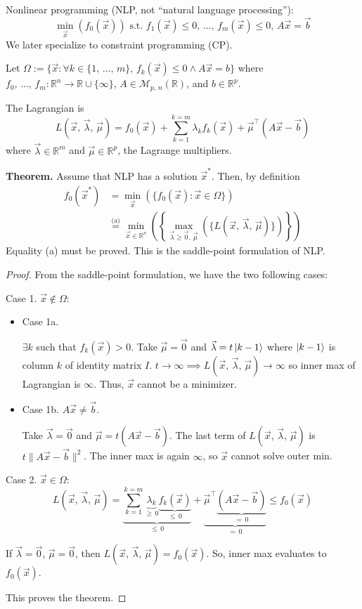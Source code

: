 \documentclass{article}
\newcommand{\R}{\mathbb{R}}             %
\newcommand{\M}{\mathcal{M}}            %
\newcommand{\x}{\vec{x}}                %
\newcommand{\rl}[1]{\left(#1\right)}
\begin{document}
Nonlinear programming (NLP, not ``natural language processing''):
\[
    \min_{\x}\rl{f_0(\x)} \text{ s.t. } f_1(\x) \leq 0,\, \ldots,\, f_m(\x) \leq 0,\, A\x = \vec{b}
\]
We later specialize to constraint programming (CP).

Let $\Omega := \{\x : \forall k \in \{1,\, \ldots,\, m\},\, f_k(\x) \leq 0 \wedge A\x = b\}$ where $f_0,\, \ldots,\, f_m \colon \R^n \to \R \cup \{\infty\}$, $A \in \M_{p,\, n}(\R)$, and $b \in \R^p$.

The Lagrangian is
\[
    L\rl{\x,\, \vec{\lambda},\, \vec{\mu}} = f_0(\x) + \sum_{k = 1}^{k = m}\lambda_k f_k(\x) + \vec{\mu}^\top(A\x - \vec{b})
\]
where $\vec{\lambda} \in \R^m$ and $\vec{\mu} \in \R^p$, the Lagrange multipliers.

\textbf{Theorem.} Assume that NLP has a solution $\x^*$. Then, by definition
\begin{align*}
    f_0(\x^*) &= \min_{\x}\rl{\{f_0(\x) : \x \in \Omega\}} \\
    &\overset{\text{(a)}}{=} \min_{\x \in \R^n}\rl{\left\{\max_{\vec{\lambda} \geq \vec{0},\, \vec{\mu}}\rl{\{L\rl{\x,\, \vec{\lambda},\, \vec{\mu}}\}}\right\}}
\end{align*}
Equality (a) must be proved. This is the saddle-point formulation of NLP.

\begin{proof}
    From the saddle-point formulation, we have the two following cases:

    Case 1. $\x \notin \Omega$:
    \begin{itemize}
        \item Case 1a.

        $\exists k$ such that $f_k(\x) > 0$. Take $\vec{\mu} = \vec{0}$ and $\vec{\lambda} = t\ket{k - 1}$ where $\ket{k - 1}$ is column $k$ of identity matrix $I$. $t \to \infty \implies L\rl{\x,\, \vec{\lambda},\, \vec{\mu}} \to \infty$ so inner max of Lagrangian is $\infty$. Thus, $\x$ cannot be a minimizer.

        \item Case 1b. $A\x \neq \vec{b}$.

        Take $\vec{\lambda} = \vec{0}$ and $\vec{\mu} = t(A\x - \vec{b})$. The last term of $L\rl{\x,\, \vec{\lambda},\, \vec{\mu}}$ is $t\|A\x - \vec{b}\|^2$. The inner max is again $\infty$, so $\x$ cannot solve outer min.
    \end{itemize}

    Case 2. $\x \in \Omega$:
    \[
        L\rl{\x,\, \vec{\lambda},\, \vec{\mu}} = \underbrace{\sum_{k = 1}^{k = m} \underbrace{\lambda_k}_{\geq\, 0} \underbrace{f_k(\x)}_{\leq\, 0}}_{\leq\, 0} + \underbrace{\vec{\mu}^\top\underbrace{(A\x - \vec{b})}_{=\, 0}}_{=\, 0} \leq f_0(\x)
    \]

    If $\vec{\lambda} = \vec{0}$, $\vec{\mu} = \vec{0}$, then $L\rl{\x,\, \vec{\lambda},\, \vec{\mu}} = f_0(\x)$. So, inner max evaluates to $f_0(\x)$.

    This proves the theorem.
\end{proof}
\end{document}
